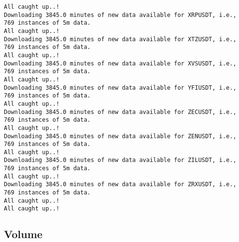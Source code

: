 \documentclass[
  letterpaper,
  DIV=11,
  numbers=noendperiod]{scrartcl}
\begin{document}
\begin{verbatim}
All caught up..!
Downloading 3845.0 minutes of new data available for XRPUSDT, i.e., 769 instances of 5m data.
All caught up..!
Downloading 3845.0 minutes of new data available for XTZUSDT, i.e., 769 instances of 5m data.
All caught up..!
Downloading 3845.0 minutes of new data available for XVSUSDT, i.e., 769 instances of 5m data.
All caught up..!
Downloading 3845.0 minutes of new data available for YFIUSDT, i.e., 769 instances of 5m data.
All caught up..!
Downloading 3845.0 minutes of new data available for ZECUSDT, i.e., 769 instances of 5m data.
All caught up..!
Downloading 3845.0 minutes of new data available for ZENUSDT, i.e., 769 instances of 5m data.
All caught up..!
Downloading 3845.0 minutes of new data available for ZILUSDT, i.e., 769 instances of 5m data.
All caught up..!
Downloading 3845.0 minutes of new data available for ZRXUSDT, i.e., 769 instances of 5m data.
All caught up..!
All caught up..!
\end{verbatim}

\hypertarget{volume}{%
\subsection{Volume}\label{volume}}
\end{document}
